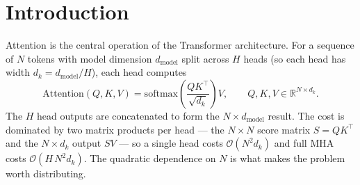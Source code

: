 \documentclass[11pt,a4paper]{article}
\newcommand{\code}[1]{\texttt{#1}}
\begin{document}
\begin{abstract}
\noindent
We parallelize the Transformer \emph{multi-head attention} (MHA) operator,
$\mathrm{Attention}(Q,K,V)=\mathrm{softmax}\!\big(QK^{\top}/\sqrt{d_k}\big)V$,
implemented from scratch in C with OpenMPI (no deep-learning frameworks). Three
strategies are compared against a sequential baseline: \emph{head parallelism}
(task decomposition), \emph{tensor parallelism} (data decomposition, with a 1D
row-block path, a 2D Cannon path, and a ring/Flash-style path that streams sharded
$K,V$ through an online softmax), and a \emph{hybrid} scheme that splits the
processes into groups via \code{MPI\_Comm\_split}; within each rank an OpenMP layer
adds shared-memory parallelism. We describe the level of
parallelism, the decomposition and mapping, the communication strategy and
topology, and load balancing; give pseudocode; and report correctness plus three
experiments: execution time vs.\ input size $N$, per-process granularity / load
balance, and speedup as the process count scales. Measured on a real three-node,
$22$-core Wi-Fi cluster, all parallel paths reproduce the sequential result within
tolerance; the computation scales to about $20\times$ on $22$ cores while
communication over the wireless link caps the end-to-end speedup near $4.4\times$
--- a textbook communication wall.
\end{abstract}
\newpage

\tableofcontents
\newpage

\section{Introduction}
Attention is the central operation of the Transformer architecture. For a
sequence of $N$ tokens with model dimension $d_{\text{model}}$ split across $H$
heads (so each head has width $d_k = d_{\text{model}}/H$), each head computes
\begin{equation}
\label{eq:attn}
\mathrm{Attention}(Q,K,V)=\mathrm{softmax}\!\left(\frac{QK^{\top}}{\sqrt{d_k}}\right)V,
\qquad Q,K,V\in\mathbb{R}^{N\times d_k}.
\end{equation}
The $H$ head outputs are concatenated to form the $N\times d_{\text{model}}$
result. The cost is dominated by two matrix products per head --- the
$N\times N$ score matrix $S=QK^{\top}$ and the $N\times d_k$ output $SV$ --- so a
single head costs $\mathcal{O}(N^2 d_k)$ and full MHA costs
$\mathcal{O}(H\,N^2 d_k)$. The quadratic dependence on $N$ is what makes the
problem worth distributing.
\end{document}

